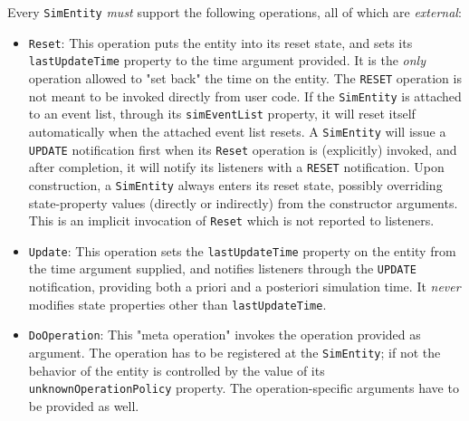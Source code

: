Every \lstinline|SimEntity| {\em must\/} support the following operations,
  all of which are {\em external\/}:
\begin{itemize}
\item \lstinline|Reset|: This operation puts the entity into its reset state,
                           and sets its \lstinline|lastUpdateTime| property
                           to the time argument provided.
                         It is the {\em only\/} operation allowed to
                           "set back" the time on the entity.
                         The \lstinline|RESET| operation is not meant
                           to be invoked directly from user code.
                         If the \lstinline|SimEntity| is attached to an
                           event list, through its \lstinline|simEventList| property,
                           it will reset itself automatically when the
                           attached event list resets.
                         A \lstinline|SimEntity| will issue
                           a \lstinline|UPDATE| notification first
                           when its \lstinline|Reset| operation is (explicitly) invoked,
                           and after completion, it will notify its listeners
                           with a \lstinline|RESET| notification.
                         Upon construction,
                           a \lstinline|SimEntity| always enters its reset state,
                           possibly overriding state-property values
                           (directly or indirectly) from the
                           constructor arguments.
                         This is an implicit invocation of \lstinline|Reset|
                           which is not reported to listeners.
\item \lstinline|Update|: This operation sets the \lstinline|lastUpdateTime|
                            property on the entity from the time argument supplied,
                            and notifies listeners through the \lstinline|UPDATE|
                            notification,
                            providing both a priori and a posteriori simulation time.
                          It {\em never\/} modifies state properties other than
                            \lstinline|lastUpdateTime|.
\item \lstinline|DoOperation|: This "meta operation" invokes the operation
                                 provided as argument.
                               The operation has to be registered at the
                                 \lstinline|SimEntity|; if not
                                 the behavior of the entity is controlled
                                 by the value of its
                                 \lstinline|unknownOperationPolicy| property.
                               The operation-specific arguments have to be provided
                                 as well.
\end{itemize}


